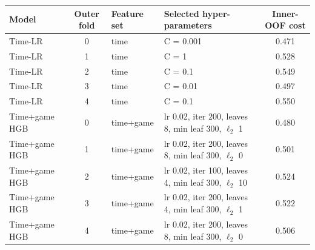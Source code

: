 \begin{tabular}{lcllc}
\toprule
Model & Outer fold & Feature set & Selected hyper-parameters & Inner-OOF cost \\
\midrule
Time-LR & 0 & time & C = 0.001 & 0.471 \\
Time-LR & 1 & time & C = 1 & 0.528 \\
Time-LR & 2 & time & C = 0.1 & 0.549 \\
Time-LR & 3 & time & C = 0.01 & 0.497 \\
Time-LR & 4 & time & C = 0.1 & 0.550 \\
Time+game HGB & 0 & time+game & lr 0.02, iter 200, leaves 8, min leaf 300, $\ell_2$ 1 & 0.480 \\
Time+game HGB & 1 & time+game & lr 0.02, iter 200, leaves 8, min leaf 300, $\ell_2$ 0 & 0.501 \\
Time+game HGB & 2 & time+game & lr 0.02, iter 100, leaves 4, min leaf 300, $\ell_2$ 10 & 0.524 \\
Time+game HGB & 3 & time+game & lr 0.02, iter 200, leaves 4, min leaf 300, $\ell_2$ 1 & 0.522 \\
Time+game HGB & 4 & time+game & lr 0.02, iter 200, leaves 8, min leaf 300, $\ell_2$ 0 & 0.506 \\
\bottomrule
\end{tabular}
